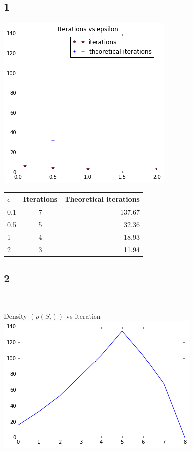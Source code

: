 \documentclass[11pt]{article}
\begin{document}
{\subsection*{1}
\includegraphics[scale=0.8]{q4c1}\\

\vspace{2cm}

\begin{tabular}{l | c | r}
\hline $\epsilon$ & Iterations & Theoretical iterations \\
\hline 0.1 & 7 & 137.67\\
\hline 0.5 & 5 & 32.36\\
\hline 1 & 4 & 18.93\\
\hline 2 & 3 & 11.94\\
\hline
\end{tabular}

\pagebreak[4]
\subsection*{2}
\

Density $(\rho(S_i))$ vs iteration\\
\includegraphics[scale=0.8]{q4c2density}\
\vspace{3cm}

}
\end{document}
